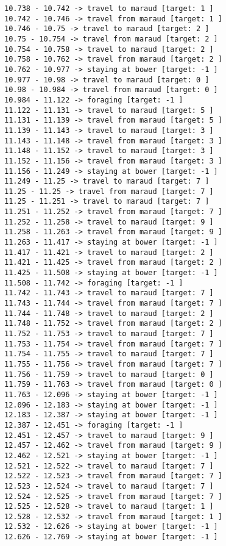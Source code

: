 \documentclass[11pt]{article}
\begin{document}
\begin{Verbatim}[commandchars=\\\{\}]
10.738 - 10.742 -> travel to maraud [target: 1 ]
10.742 - 10.746 -> travel from maraud [target: 1 ]
10.746 - 10.75 -> travel to maraud [target: 2 ]
10.75 - 10.754 -> travel from maraud [target: 2 ]
10.754 - 10.758 -> travel to maraud [target: 2 ]
10.758 - 10.762 -> travel from maraud [target: 2 ]
10.762 - 10.977 -> staying at bower [target: -1 ]
10.977 - 10.98 -> travel to maraud [target: 0 ]
10.98 - 10.984 -> travel from maraud [target: 0 ]
10.984 - 11.122 -> foraging [target: -1 ]
11.122 - 11.131 -> travel to maraud [target: 5 ]
11.131 - 11.139 -> travel from maraud [target: 5 ]
11.139 - 11.143 -> travel to maraud [target: 3 ]
11.143 - 11.148 -> travel from maraud [target: 3 ]
11.148 - 11.152 -> travel to maraud [target: 3 ]
11.152 - 11.156 -> travel from maraud [target: 3 ]
11.156 - 11.249 -> staying at bower [target: -1 ]
11.249 - 11.25 -> travel to maraud [target: 7 ]
11.25 - 11.25 -> travel from maraud [target: 7 ]
11.25 - 11.251 -> travel to maraud [target: 7 ]
11.251 - 11.252 -> travel from maraud [target: 7 ]
11.252 - 11.258 -> travel to maraud [target: 9 ]
11.258 - 11.263 -> travel from maraud [target: 9 ]
11.263 - 11.417 -> staying at bower [target: -1 ]
11.417 - 11.421 -> travel to maraud [target: 2 ]
11.421 - 11.425 -> travel from maraud [target: 2 ]
11.425 - 11.508 -> staying at bower [target: -1 ]
11.508 - 11.742 -> foraging [target: -1 ]
11.742 - 11.743 -> travel to maraud [target: 7 ]
11.743 - 11.744 -> travel from maraud [target: 7 ]
11.744 - 11.748 -> travel to maraud [target: 2 ]
11.748 - 11.752 -> travel from maraud [target: 2 ]
11.752 - 11.753 -> travel to maraud [target: 7 ]
11.753 - 11.754 -> travel from maraud [target: 7 ]
11.754 - 11.755 -> travel to maraud [target: 7 ]
11.755 - 11.756 -> travel from maraud [target: 7 ]
11.756 - 11.759 -> travel to maraud [target: 0 ]
11.759 - 11.763 -> travel from maraud [target: 0 ]
11.763 - 12.096 -> staying at bower [target: -1 ]
12.096 - 12.183 -> staying at bower [target: -1 ]
12.183 - 12.387 -> staying at bower [target: -1 ]
12.387 - 12.451 -> foraging [target: -1 ]
12.451 - 12.457 -> travel to maraud [target: 9 ]
12.457 - 12.462 -> travel from maraud [target: 9 ]
12.462 - 12.521 -> staying at bower [target: -1 ]
12.521 - 12.522 -> travel to maraud [target: 7 ]
12.522 - 12.523 -> travel from maraud [target: 7 ]
12.523 - 12.524 -> travel to maraud [target: 7 ]
12.524 - 12.525 -> travel from maraud [target: 7 ]
12.525 - 12.528 -> travel to maraud [target: 1 ]
12.528 - 12.532 -> travel from maraud [target: 1 ]
12.532 - 12.626 -> staying at bower [target: -1 ]
12.626 - 12.769 -> staying at bower [target: -1 ]

\end{Verbatim}
\end{document}
